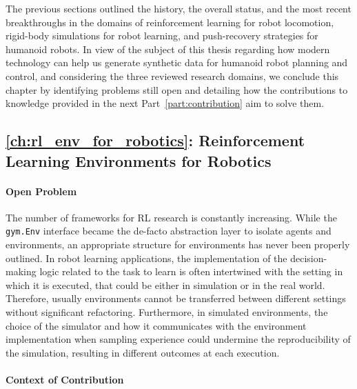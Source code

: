The previous sections outlined the history, the overall status, and the most recent breakthroughs in the domains of reinforcement learning for robot locomotion, rigid-body simulations for robot learning, and push-recovery strategies for humanoid robots.
In view of the subject of this thesis regarding how modern technology can help us generate synthetic data for humanoid robot planning and control, and considering the three reviewed research domains, we conclude this chapter by identifying problems still open and detailing how the contributions to knowledge provided in the next Part~\ref{part:contribution} aim to solve them.

\subsection{\autoref{ch:rl_env_for_robotics}: Reinforcement Learning Environments for Robotics}

\paragraph{Open Problem}

The number of frameworks for \ac{RL} research is constantly increasing.
While the \verb|gym.Env| interface became the de-facto abstraction layer to isolate agents and environments, an appropriate structure for environments has never been properly outlined.
In robot learning applications, the implementation of the decision-making logic related to the task to learn is often intertwined with the setting in which it is executed, that could be either in simulation or in the real world.
Therefore, usually environments cannot be transferred between different settings without significant refactoring.
Furthermore, in simulated environments, the choice of the simulator and how it communicates with the environment implementation when sampling experience could undermine the reproducibility of the simulation, resulting in different outcomes at each execution.

\paragraph{Context of Contribution}

